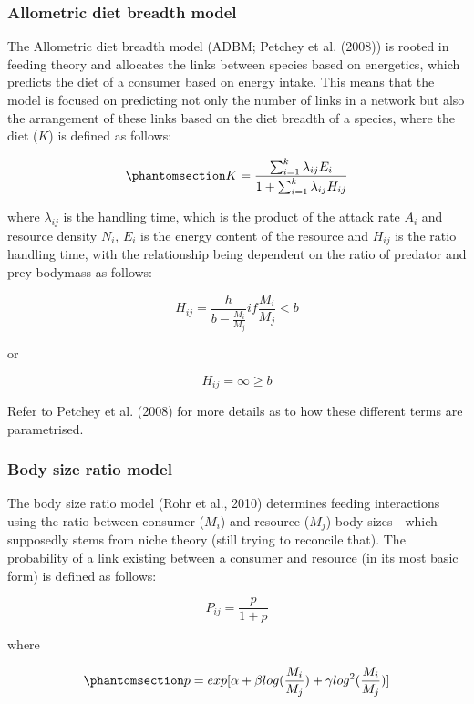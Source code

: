 \documentclass[
]{article}
\begin{document}
\subsubsection{Allometric diet breadth
model}\label{allometric-diet-breadth-model}

The Allometric diet breadth model (ADBM; Petchey et al. (2008)) is
rooted in feeding theory and allocates the links between species based
on energetics, which predicts the diet of a consumer based on energy
intake. This means that the model is focused on predicting not only the
number of links in a network but also the arrangement of these links
based on the diet breadth of a species, where the diet (\(K\)) is
defined as follows:

\begin{equation}\phantomsection\label{eq-adbm}{
K = \frac{\sum_{i=1}^{k}\lambda_{ij}E_{i}}{1+\sum_{i=1}^{k}\lambda_{ij}H_{ij}}
}\end{equation}

where \(\lambda_{ij}\) is the handling time, which is the product of the
attack rate \(A_{i}\) and resource density \(N_{i}\), \(E_{i}\) is the
energy content of the resource and \(H_{ij}\) is the ratio handling
time, with the relationship being dependent on the ratio of predator and
prey bodymass as follows:

\[
H_{ij} = \frac{h}{b - \frac{M_{i}}{M_{j}}} if \frac{M_{i}}{M_{j}} < b
\]

or

\[
H_{ij} = \infty \geq b
\]

Refer to Petchey et al. (2008) for more details as to how these
different terms are parametrised.

\subsubsection{Body size ratio model}\label{body-size-ratio-model}

The body size ratio model (Rohr et al., 2010) determines feeding
interactions using the ratio between consumer (\(M_{i}\)) and resource
(\(M_{j}\)) body sizes - which supposedly stems from niche theory (still
trying to reconcile that). The probability of a link existing between a
consumer and resource (in its most basic form) is defined as follows:

\[
P_{ij} = \frac{p}{1+p}
\]

where

\begin{equation}\phantomsection\label{eq-bodymass}{
p = exp[\alpha + \beta log(\frac{M_{i}}{M_{j}}) + \gamma log^{2}(\frac{M_{i}}{M_{j}})]
}\end{equation}
\end{document}

